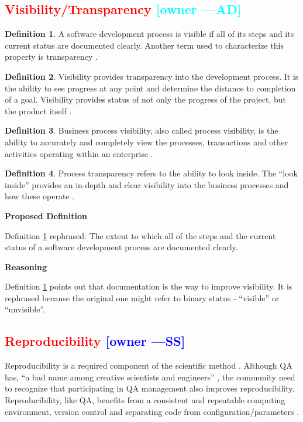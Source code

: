 \documentclass[letterpaper,cleveref]{lipics-v2019}
\newcommand{\authornote}[3]{\textcolor{#1}{[#3 ---#2]}}
\newcommand{\authornote}[3]{}
\newcommand{\wss}[1]{\authornote{blue}{SS}{#1}} %
\newcommand{\ad}[1]{\authornote{cyan}{AD}{#1}} %
\newcommand{\notdone}[1]{\textcolor{red}{#1}}
\theoremstyle{definition}
\newtheorem{defn}{Definition}
\begin{document}
\subsection{\notdone{Visibility/Transparency} \ad{owner}}

\begin{defn}
\label{VisibilitySelected}
A software development process is visible if all of its steps and its current
status are documented clearly. Another term used to characterize this property
is transparency \citep{ghezzi1991fundamentals}.
\end{defn}

\begin{defn}
Visibility provides transparency into the development process. It is the ability
to see progress at any point and determine the distance to completion of a goal.
Visibility provides status of not only the progress of the project, but the
product itself \citep{GSA2019}.
\end{defn}

\begin{defn}
Business process visibility, also called process visibility, is the ability to
accurately and completely view the processes, transactions and other activities
operating within an enterprise \citep{Rouse2013}.
\end{defn}

\begin{defn}
Process transparency refers to the ability to look inside. The “look inside”
provides an in-depth and clear visibility into the business processes and how
these operate \citep{PRIME2019}.
\end{defn}
      
\noindent \textbf{Proposed Definition} 

Definition \ref{VisibilitySelected} rephrased: The extent to which all of the
steps and the current status of a software development process are documented
clearly.

\noindent \textbf{Reasoning}

Definition \ref{VisibilitySelected} points out that documentation is the way to improve visibility. It is
rephrased because the original one might refer to binary status - ``visible'' or
``unvisible''.

\subsection{\notdone{Reproducibility} \wss{owner}}

Reproducibility is a required component of the scientific
method \citep{Davison2012}.  Although QA has, ``a bad name among creative
scientists and engineers'' \citep[p.~352]{Roache1998}, the community need to
recognize that participating in QA management also improves reproducibility.
Reproducibility, like QA, benefits from a consistent and repeatable computing
environment, version control and separating code from
configuration/parameters \citep{Davison2012}.
\end{document}
